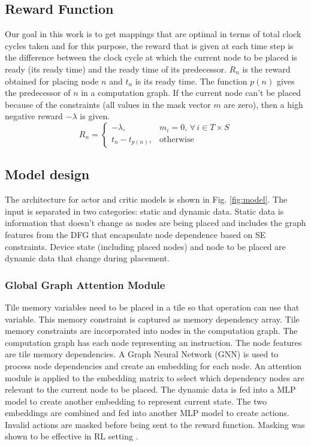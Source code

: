 \subsection{Reward Function}
Our goal in this work is to get mappings that are optimal in terms of total clock cycles taken and for this purpose, the reward that is given at each time step is the difference between the clock cycle at which the current node to be placed is ready (its ready time) and the ready time of its predecessor. 
$R_n$ is the reward obtained for placing node $n$ and $t_n$ is its ready time. 
The function $p(n)$ gives the predecessor of $n$ in a computation graph. 
If the current node can't be placed because of the constraints (all values in the mask vector $m$ are zero), then a high negative reward $-\lambda$ is given.
\[
  R_n =
  \begin{cases}
    -\lambda,& m_i = 0, \, \forall \, i \in T \times S \\
    t_n - t_{p(n)}, & \text{otherwise}
    
  \end{cases}
\]

\subsection{Model design}

The architecture for actor and critic models is shown in Fig. \ref{fig:model}.
The input is separated in two categories: static and dynamic data. 
Static data is information that doesn't change as nodes are being placed and includes the graph features from the DFG that encapsulate node dependence based on SE constraints.
Device state (including placed nodes) and node to be placed are dynamic data that change during placement.

\subsubsection{Global Graph Attention Module}

Tile memory variables need to be placed in a tile so that operation can use that variable. 
This memory constraint is captured as memory dependency array. 
Tile memory constraints are incorporated into nodes in the computation graph. 
The computation graph has each node representing an instruction. 
The node features are tile memory dependencies. 
A Graph Neural Network (GNN) is used to process node dependencies and create an embedding for each node. 
An attention module is applied to the embedding matrix to select which dependency nodes are relevant to the current node to be placed. The dynamic data is fed into a MLP model to 
create another embedding to represent current state. 
The two embeddings are combined and fed into another MLP model to 
create actions. 
Invalid actions are masked before being sent to the reward function. Masking was shown to be effective in RL setting \cite{Shengyi_mask}.



